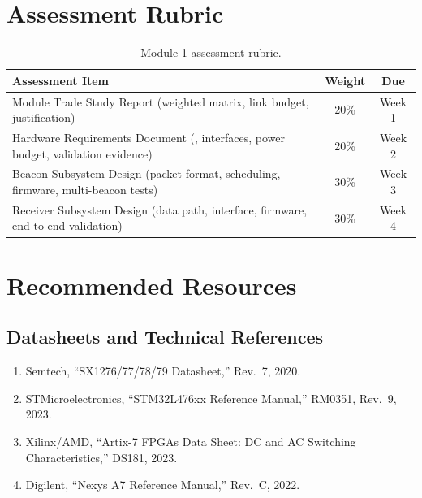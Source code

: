 \documentclass[11pt,letterpaper]{article}
\begin{document}
	\section{Assessment Rubric}
	
	\begin{table}[ht!]
		\centering
		\caption{Module 1 assessment rubric.}
		\label{tab:rubric}
		\renewcommand{\arraystretch}{1.3}
		\begin{tabularx}{\textwidth}{X c c}
			\toprule
			\textbf{Assessment Item} & \textbf{Weight} & \textbf{Due} \\
			\midrule
			\RF{} Module Trade Study Report (weighted matrix, link budget, justification) & 20\% & Week 1 \\
			Hardware Requirements Document (\BOM{}, interfaces, power budget, validation evidence) & 20\% & Week 2 \\
			Beacon Subsystem Design (packet format, scheduling, firmware, multi-beacon tests) & 30\% & Week 3 \\
			Receiver Subsystem Design (data path, interface, firmware, end-to-end validation) & 30\% & Week 4 \\
			\bottomrule
		\end{tabularx}
	\end{table}
	
	
	\newpage
	\section{Recommended Resources}
	
	\subsection{Datasheets and Technical References}
	
	\begin{enumerate}[leftmargin=2em]
		\item Semtech, ``SX1276/77/78/79 Datasheet,'' Rev.\ 7, 2020.
		\item STMicroelectronics, ``STM32L476xx Reference Manual,'' RM0351, Rev.\ 9, 2023.
		\item Xilinx/AMD, ``Artix-7 FPGAs Data Sheet: DC and AC Switching Characteristics,'' DS181, 2023.
		\item Digilent, ``Nexys A7 Reference Manual,'' Rev.\ C, 2022.
	\end{enumerate}
	
\end{document}
